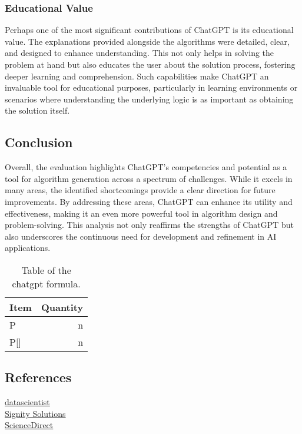 \documentclass{article}
\begin{document}
\subsubsection{Educational Value}

Perhaps one of the most significant contributions of ChatGPT is its educational value. The explanations provided alongside the algorithms were detailed, clear, and designed to enhance understanding. This not only helps in solving the problem at hand but also educates the user about the solution process, fostering deeper learning and comprehension. Such capabilities make ChatGPT an invaluable tool for educational purposes, particularly in learning environments or scenarios where understanding the underlying logic is as important as obtaining the solution itself.

\subsection{Conclusion}

Overall, the evaluation highlights ChatGPT’s competencies and potential as a tool for algorithm generation across a spectrum of challenges. While it excels in many areas, the identified shortcomings provide a clear direction for future improvements. By addressing these areas, ChatGPT can enhance its utility and effectiveness, making it an even more powerful tool in algorithm design and problem-solving. This analysis not only reaffirms the strengths of ChatGPT but also underscores the continuous need for development and refinement in AI applications.










\begin{table}
\centering
\begin{tabular}{l|r}
Item & Quantity \\\hline
P & n \\
P[] & n
\end{tabular}
\caption{\label{tab:widgets}Table of the chatgpt formula.}
\end{table}



\subsection{References}
\href{https://datascientest.com/en/chatgpt-how-does-this-nlp-algorithm-work#:~:text=ChatGPT%20also%20has%20capabilities%20normally,to%20be%20generated%20should%20return.}
{datascientist} \\
\href{https://www.signitysolutions.com/tech-insights/using-chatgpt-to-solve-complex-coding}{Signity Solutions} \\
\href{https://www.sciencedirect.com/science/article/pii/S2949882123000051}{ScienceDirect}
\end{document}
